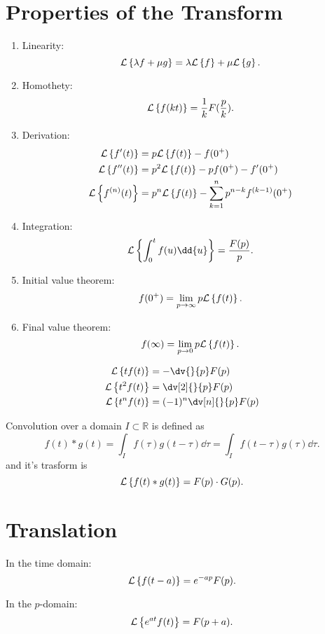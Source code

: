 \section{Properties of the Transform}

\begin{enumerate}
    \item Linearity:
        \[
            \mathcal{L} \left\{ \lambda f + \mu g \right\} = \lambda \mathcal{L} \left\{ f \right\} + \mu \mathcal{L} \left\{ g \right\}
        .\] 
    \item Homothety:
        \[
            \mathcal{L} \left\{ f(kt) \right\} = \frac{1}{k} F(\frac{p}{k})
        .\] 
    \item Derivation:
        \begin{align*}
            \mathcal{L} \left\{ f'(t) \right\} &= p \mathcal{L} \left\{ f(t) \right\}-f(0^+)\\
            \mathcal{L} \left\{ f''(t) \right\} &= p^2\mathcal{L} \left\{ f(t) \right\} - pf(0^+) - f'(0^+)\\
            \mathcal{L} \left\{ f^{(n)}(t) \right\} &= p^{n}\mathcal{L} \left\{ f(t) \right\}-\sum_{k=1}^{n}p^{n-k}f^{(k-1)}(0^{+})
        \end{align*}
    \item Integration:
        \[
            \La{\int_0^t f(u)\dd {u}} = \frac{F(p)}{p} 
        .\] 
    \item Initial value theorem:
        \[
            f(0^+) = \lim_{p \to \infty} p \mathcal{L} \left\{ f(t) \right\} 
        .\] 
    \item Final value theorem:
        \[
            f(\infty) = \lim_{p \to 0} p \mathcal{L} \left\{ f(t) \right\} 
        .\] 
\end{enumerate}

\begin{remark}
    \begin{align*}
        \La{tf(t)} &= -\dv{}{p} F(p)\\
        \La{t^2f(t)} &= \dv[2]{}{p} F(p)\\
        \La{t^nf(t)} &= (-1)^n \dv[n]{}{p} F(p)
    \end{align*}
\end{remark}

\begin{remark}
    Convolution over a domain $I\subset \mathbb{R}$ is defined as 
    \[
        f(t)*g(t) = \int_I f(\tau)g(t-\tau)\dd {\tau} = \int_I f(t-\tau)g(\tau)\dd {\tau}
    .\]
    and it's trasform is
    \[
        \mathcal{L} \left\{ f(t)*g(t) \right\} = F(p)\cdot G(p)
    .\] 
\end{remark}

\section{Translation}
In the time domain:
\[
    \mathcal{L} \left\{ f(t-a) \right\} = e^{-ap} F(p)
.\] 

In the $p$-domain:
 \[
     \mathcal{L} \left\{ e^{at} f(t) \right\} = F(p+a)
.\] 

